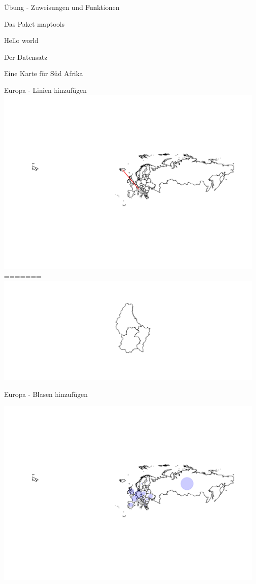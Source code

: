 \documentclass[ignorenonframetext,]{beamer}
\begin{document}
\begin{frame}[fragile]{Übung - Zuweisungen und Funktionen}
\begin{frame}[fragile]{Das Paket maptools}
\begin{frame}[fragile]{Hello world}
\begin{frame}[fragile]{Der Datensatz}
\begin{frame}[fragile]{Eine Karte für Süd Afrika}
\begin{frame}[fragile]{Europa - Linien hinzufügen}
\includegraphics{Geomedizin_files/figure-beamer/unnamed-chunk-88-1.pdf}
=======
\includegraphics{Geomedizin_files/figure-beamer/unnamed-chunk-105-1.pdf}

\end{frame}

\begin{frame}{Europa - Blasen hinzufügen}

\includegraphics{Geomedizin_files/figure-beamer/unnamed-chunk-106-1.pdf}


\end{frame}
\end{frame}
\end{frame}
\end{frame}
\end{frame}
\end{frame}
\end{document}
